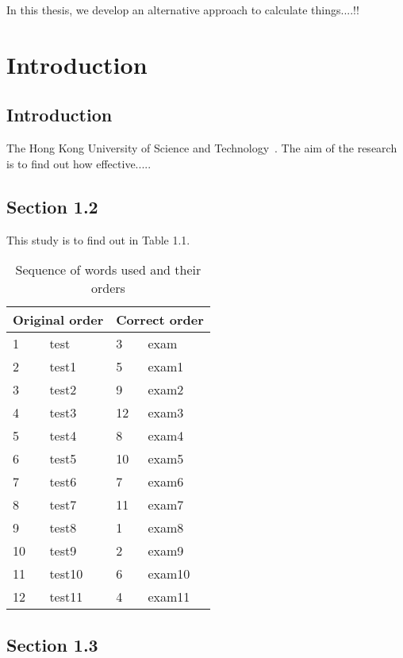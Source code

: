 \documentclass[12pt,a4]{report}
\begin{document}
In this thesis, we develop an alternative approach to calculate things....!!


\newpage
{}

\chapter*{Introduction}

\section{Introduction}

The Hong Kong University of Science and Technology~\cite{C. D. Mee}.
The aim of the research~\cite{S. Tehrani} is to find out how
effective.....

\section{Section 1.2}

This study is to find out in Table 1.1.
\begin{table}[ht]
\begin{center}
\begin{tabular}{|l|l||l|l|}
\hline
\multicolumn{2}{|c||}{Original order} & \multicolumn{2}{c|}{Correct order} \\ \hline
1 & test & 3 & exam \\
2 & test1 & 5 & exam1 \\
3 & test2 & 9 & exam2 \\
4 & test3 & 12 & exam3 \\
5 & test4 & 8 & exam4 \\
6 & test5 & 10 & exam5 \\
7 & test6 & 7 & exam6 \\
8 & test7 & 11 & exam7 \\
9 & test8 & 1 & exam8 \\
10 & test9 & 2 & exam9 \\
11 & test10 & 6 & exam10 \\
12 & test11 & 4 & exam11 \\ \hline
\end{tabular}
\caption{Sequence of words used and their orders}
\end{center}
\end{table}

\section{Section 1.3}
\end{document}
